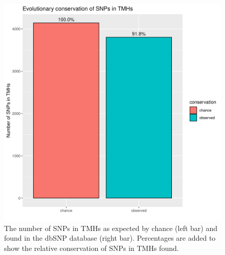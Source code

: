\begin{figure}[!htbp]
  \includegraphics[width=\textwidth]{ncbi_peregrine_results/fig_conservation.png}
  \caption{
    The number of SNPs in TMHs as expected by chance (left bar) 
    and found in the dbSNP database (right bar).
    Percentages are added to show the relative conservation
    of SNPs in TMHs found.
  }
  \label{fig:conservation}
\end{figure}

